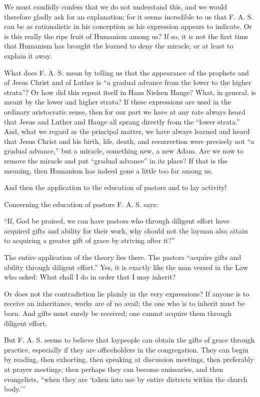 We must candidly confess that we do not understand this, and we would therefore gladly ask for an explanation; for it seems incredible to us that F. A. S. can be as rationalistic in his conception as his expression appears to indicate. Or is this really the ripe fruit of Humanism among us? If so, it is not the first time that Humanism has brought the learned to deny the miracle, or at least to explain it away.

What does F. A. S. mean by telling us that the appearance of the prophets and of Jesus Christ and of Luther is “a gradual advance from the lower to the higher strata”? Or how did this repeat itself in Hans Nielsen Hauge? What, in general, is meant by the lower and higher strata? If these expressions are used in the ordinary aristocratic sense, then for our part we have at any rate always heard that Jesus and Luther and Hauge all sprang directly from the “lower strata.” And, what we regard as the principal matter, we have always learned and heard that Jesus Christ and his birth, life, death, and resurrection were precisely not “a gradual advance,” but a miracle, something new, a new Adam. Are we now to remove the miracle and put “gradual advance” in its place? If that is the meaning, then Humanism has indeed gone a little too far among us.

And then the application to the education of pastors and to lay activity!

Concerning the education of pastors F. A. S. says:

“If, God be praised, we can have pastors who through diligent effort have acquired gifts and ability for their work, why should not the layman also attain to acquiring a greater gift of grace by striving after it?”

The entire application of the theory lies there. The pastors “acquire gifts and ability through diligent effort.” Yes, it is exactly like the man versed in the Law who asked: What shall I do in order that I may inherit?

Or does not the contradiction lie plainly in the very expressions? If anyone is to receive an inheritance, works are of no avail; the one who is to inherit must be born. And gifts must surely be received; one cannot acquire them through diligent effort.

But F. A. S. seems to believe that laypeople can obtain the gifts of grace through practice, especially if they are officeholders in the congregation. They can begin by reading, then exhorting, then speaking at discussion meetings, then preferably at prayer meetings; then perhaps they can become emissaries, and then evangelists, “when they are ‘taken into use by entire districts within the church body.’”

